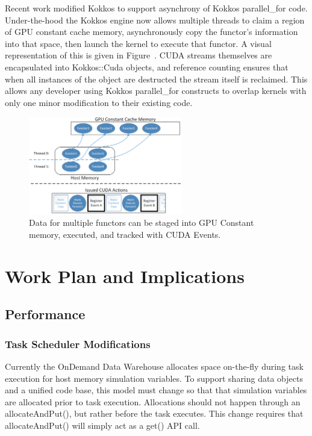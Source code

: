 \documentclass[12pt]{article}
\begin{document}
Recent work modified Kokkos to support asynchrony of Kokkos parallel\_for code.  Under-the-hood the Kokkos engine now allows multiple threads to claim a region of GPU constant cache memory, asynchronously copy the functor’s information into that space, then launch the kernel to execute that functor.  A visual representation of this is given in Figure~\cite{fig:kokkos-constant-cache-new}.  CUDA streams themselves are encapsulated into Kokkos::Cuda objects, and reference counting ensures that when all instances of the object are destructed the stream itself is reclaimed.  This allows any developer using Kokkos parallel\_for constructs to overlap kernels with only one minor modification to their existing code. 

\begin{figure}
	\centering
	\includegraphics[width=0.60\textwidth]{figures/Kokkos_constant_cache_new.png}
	\caption{Data for multiple functors can be staged into GPU Constant memory, executed, and tracked with CUDA Events.   }
	\label{fig:kokkos-constant-cache-new}
\end{figure}


\section{Work Plan and Implications}
\label{ch:workplan}

\subsection{Performance}
\label{ch:workplan-performance}
\subsubsection{Task Scheduler Modifications}
\label{ch:task-scheduler-modification}
Currently the OnDemand Data Warehouse allocates space on-the-fly during task execution for host memory simulation variables.  To support sharing data objects and a unified code base, this model must change so that that simulation variables are allocated prior to task execution.   Allocations should not happen through an allocateAndPut(), but rather before the task executes.  This change requires that allocateAndPut() will simply act as a get() API call.
\end{document}
